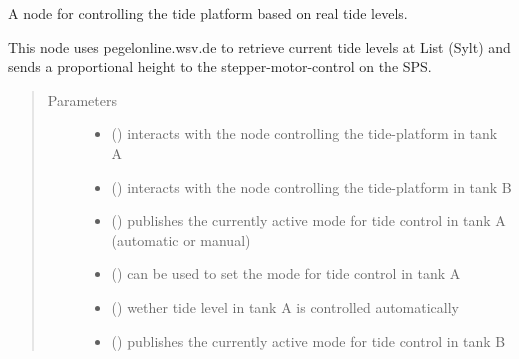 \documentclass[a4paper,12pt,twoside]{article}
\begin{document}
\label{\detokenize{meso_control_pkg:module-meso_control_pkg.tide_sim}}

\begin{fulllineitems}
\label{\detokenize{meso_control_pkg:meso_control_pkg.tide_sim.TideSim}}
A node for controlling the tide platform based on real tide levels.

This node uses pegelonline.wsv.de to retrieve current tide levels at List (Sylt)
and sends a proportional height to the stepper-motor-control on the SPS.
\begin{quote}\begin{description}
\item[{Parameters}] \leavevmode\begin{itemize}
\item {} 
 () \textendash{} interacts with the node controlling the tide-platform in tank A

\item {} 
 () \textendash{} interacts with the node controlling the tide-platform in tank B

\item {} 
 () \textendash{} publishes the currently active mode for tide control in
tank A (automatic or manual)

\item {} 
 () \textendash{} can be used to set the mode for tide control in tank A

\item {} 
 () \textendash{} wether tide level in tank A is controlled automatically

\item {} 
 () \textendash{} publishes the currently active mode for tide control in
tank B


\end{itemize}
\end{description}
\end{quote}
\end{fulllineitems}
\end{document}
